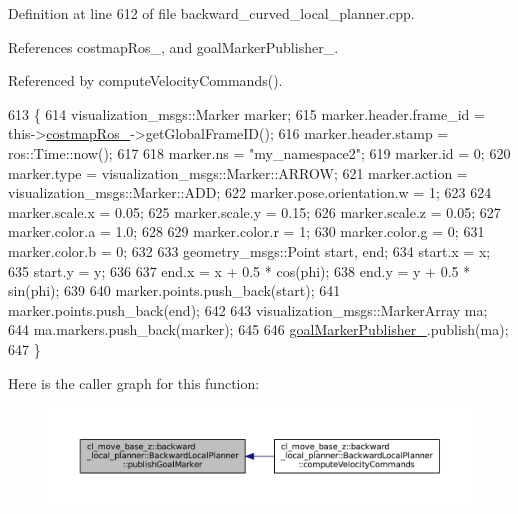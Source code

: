 Definition at line 612 of file backward\+\_\+curved\+\_\+local\+\_\+planner.\+cpp.



References costmap\+Ros\+\_\+, and goal\+Marker\+Publisher\+\_\+.



Referenced by compute\+Velocity\+Commands().


\begin{DoxyCode}
613         \{
614             visualization\_msgs::Marker marker;
615             marker.header.frame\_id = this->\hyperlink{classcl__move__base__z_1_1backward__local__planner_1_1BackwardLocalPlanner_a4136268882a105d9e06e173d85d5c0dc}{costmapRos\_}->getGlobalFrameID();
616             marker.header.stamp = ros::Time::now();
617 
618             marker.ns = \textcolor{stringliteral}{"my\_namespace2"};
619             marker.id = 0;
620             marker.type = visualization\_msgs::Marker::ARROW;
621             marker.action = visualization\_msgs::Marker::ADD;
622             marker.pose.orientation.w = 1;
623 
624             marker.scale.x = 0.05;
625             marker.scale.y = 0.15;
626             marker.scale.z = 0.05;
627             marker.color.a = 1.0;
628 
629             marker.color.r = 1;
630             marker.color.g = 0;
631             marker.color.b = 0;
632 
633             geometry\_msgs::Point start, end;
634             start.x = x;
635             start.y = y;
636 
637             end.x = x + 0.5 * cos(phi);
638             end.y = y + 0.5 * sin(phi);
639 
640             marker.points.push\_back(start);
641             marker.points.push\_back(end);
642 
643             visualization\_msgs::MarkerArray ma;
644             ma.markers.push\_back(marker);
645 
646             \hyperlink{classcl__move__base__z_1_1backward__local__planner_1_1BackwardLocalPlanner_a79f0ddfa686e2cd47bbc2f0bac9f3d4c}{goalMarkerPublisher\_}.publish(ma);
647         \}
\end{DoxyCode}
Here is the caller graph for this function\+:
\nopagebreak
\begin{figure}[H]
\begin{center}
\leavevmode
\includegraphics[width=350pt]{classcl__move__base__z_1_1backward__local__planner_1_1BackwardLocalPlanner_a70eaeb6cf31fd3378d9fbf9bcb975995_icgraph}
\end{center}
\end{figure}
